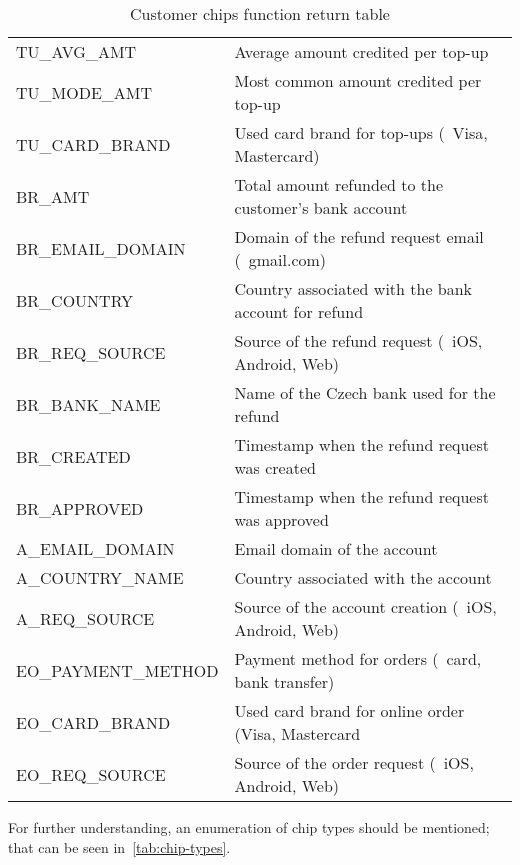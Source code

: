 \begin{table}[htbp]
\begin{tabularx}{\textwidth}{|>{\columncolor{unicorn_blue!5}}X|>{\columncolor{unicorn_blue!5}}l|}
		TU\_AVG\_AMT & Average amount credited per top-up \\
		TU\_MODE\_AMT & Most common amount credited per top-up \\
		TU\_CARD\_BRAND & Used card brand for top-ups (\eg~Visa, Mastercard) \\
		\hline
		BR\_AMT & Total amount refunded to the customer's bank account \\
		BR\_EMAIL\_DOMAIN & Domain of the refund request email (\eg~gmail.com) \\
		BR\_COUNTRY & Country associated with the bank account for refund \\
		BR\_REQ\_SOURCE & Source of the refund request (\eg~iOS, Android, Web) \\
		BR\_BANK\_NAME & Name of the Czech bank used for the refund \\
		BR\_CREATED & Timestamp when the refund request was created \\
		BR\_APPROVED & Timestamp when the refund request was approved \\
		\hline
		A\_EMAIL\_DOMAIN & Email domain of the account \\
		A\_COUNTRY\_NAME & Country associated with the account \\
		A\_REQ\_SOURCE & Source of the account creation (\eg~iOS, Android, Web) \\
		EO\_PAYMENT\_METHOD & Payment method for orders (\eg~card, bank transfer) \\
		EO\_CARD\_BRAND & Used card brand for online order (Visa, Mastercard \\
		EO\_REQ\_SOURCE & Source of the order request (\eg~iOS, Android, Web) \\
		\hline
	\end{tabularx}
	\caption{Customer chips function return table}
	\label{tab:chip-customers-columns}
	\source
\end{table}

For further understanding, an enumeration of chip types should be mentioned; that can be seen in~\autoref{tab:chip-types}.

